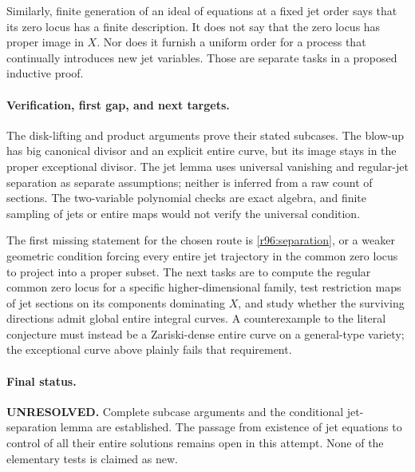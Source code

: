 \documentclass[11pt]{article}
\begin{document}
Similarly, finite generation of an ideal of equations at a fixed jet
order says that its zero locus has a finite description. It does not
say that the zero locus has proper image in $X$. Nor does it furnish
a uniform order for a process that continually introduces new jet
variables. Those are separate tasks in a proposed inductive proof.

\paragraph{Verification, first gap, and next targets.}
The disk-lifting and product arguments prove their stated subcases.
The blow-up has big canonical divisor and an explicit entire curve,
but its image stays in the proper exceptional divisor. The jet lemma
uses universal vanishing and regular-jet separation as separate
assumptions; neither is inferred from a raw count of sections. The
two-variable polynomial checks are exact algebra, and finite sampling
of jets or entire maps would not verify the universal condition.

The first missing statement for the chosen route is
\eqref{r96:separation}, or a weaker geometric condition forcing every
entire jet trajectory in the common zero locus to project into a
proper subset. The next tasks are to compute the regular common zero
locus for a specific higher-dimensional family, test restriction maps
of jet sections on its components dominating $X$, and study whether
the surviving directions admit global entire integral curves. A
counterexample to the literal conjecture must instead be a
Zariski-dense entire curve on a general-type variety; the exceptional
curve above plainly fails that requirement.

\paragraph{Final status.}
\textbf{UNRESOLVED.} Complete subcase arguments and the conditional
jet-separation lemma are established. The passage from existence of
jet equations to control of all their entire solutions remains open
in this attempt. None of the elementary tests is claimed as new.
\end{document}
